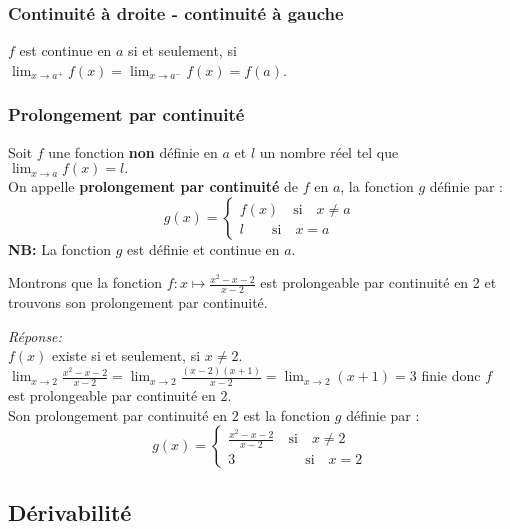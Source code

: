 \subsubsection*{ Continuité à droite - continuité à gauche}
\begin{property}
$ f $ est continue en $ a $ si et seulement, si  $\displaystyle \lim_{x \to a^{+}}f(x)=\displaystyle\lim_{x \to a^{-}}f(x)=f(a) $. 
\end{property}
\subsubsection*{Prolongement par continuité}
\begin{definition}
Soit $ f $ une fonction  \textbf{non}  définie en $ a $ et $ l $ un nombre réel tel que $ \displaystyle\lim_{x \to a}f(x)=l. $\\
On appelle \textbf{prolongement par continuité } de $ f $ en $ a $, la fonction $ g $ définie par :
\[ g (x)=\left\{\begin{array}{l} f(x)\quad \textrm{si} \quad x\neq a \\ l                      \quad \quad \textrm{si}\quad x= a  \end{array} \right.\]
\textbf{NB:} La fonction $ g $ est définie et continue en $ a $.
\end{definition}
\begin{example}
Montrons que la fonction $ f: x \mapsto \frac{x^{2}-x-2}{x-2} $   est prolongeable par continuité en 2 et trouvons son prolongement par continuité.
\end{example}

\textsl{Réponse:}\\
$ f(x) $ existe si et seulement, si $ x\neq 2 $.\\  $\displaystyle\lim_{x \to 2 }\frac{x^{2}-x-2}{x-2}=\displaystyle\lim_{x \to 2 }\frac{(x-2)(x+1)}{x-2}= \displaystyle\lim_{x \to 2 }(x+1)=3 $   finie donc $ f $ est prolongeable par continuité en $ 2. $\\
Son prolongement par continuité en $ 2$ est la fonction $ g $ définie par : 
\[ g (x)=\left\{\begin{array}{l} \frac{x^{2}-x-2}{x-2} \quad \textrm{si} \quad x\neq 2 \\ 3\quad \quad \qquad \quad  \textrm{si}\quad x= 2  \end{array} \right.\]

\subsection{Dérivabilité}
